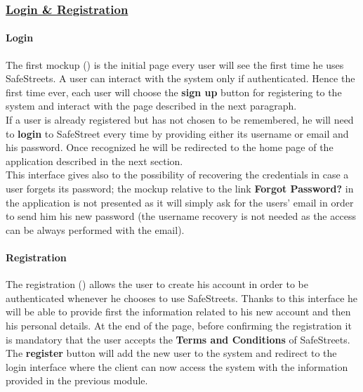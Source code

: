 		\subsubsection[Login \& Registration]{\hyperlink{toc}{Login \& Registration}}
			\label{sec:userLoginRegistration}
			
			\paragraph{Login}
				The first mockup () is the initial page every user will see the first time he uses SafeStreets. A user can interact with the system only if authenticated. Hence the first time ever, each user will choose the \textbf{sign up} button for registering to the system and interact with the page described in the next paragraph.\\
				
				If a user is already registered but has not chosen to be remembered, he will need to \textbf{login} to SafeStreet every time by providing either its username or email and his password. Once recognized he will be redirected to the home page of the application described in the next section.\\
				
				This interface gives also to the possibility of recovering the credentials in case a user forgets its password; the mockup relative to the link \textbf{Forgot Password?} in the application is not presented as it will simply ask for the users' email in order to send him his new password (the username recovery is not needed as the access can be always performed with the email).
				
			\paragraph{Registration}
				The registration () allows the user to create his account in order to be authenticated whenever he chooses to use SafeStreets. Thanks to this interface he will be able to provide first the information related to his new account and then his personal details. At the end of the page, before confirming the registration it is mandatory that the user accepts the \textbf{Terms and Conditions} of SafeStreets.\\
				
				The \textbf{register} button will add the new user to the system and redirect to the login interface where the client can now access the system with the information provided in the previous module.
				
